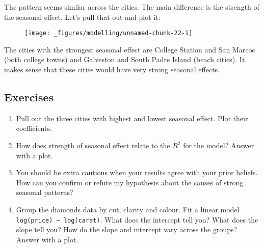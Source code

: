 The pattern seems similar across the cities. The main difference is the
strength of the seasonal effect. Let's pull that out and plot it:

\begin{Shaded}
\end{Shaded}

\begin{figure}[H]
  \centering
  \texttt{[image: \_figures/modelling/unnamed-chunk-22-1]}
\end{figure}

The cities with the strongest seasonal effect are College Station and
San Marcos (both college towns) and Galveston and South Padre Island
(beach cities). It makes sense that these cities would have very strong
seasonal effects.

\subsection{Exercises}

\begin{enumerate}
\def\labelenumi{\arabic{enumi}.}
\item
  Pull out the three cities with highest and lowest seasonal effect.
  Plot their coefficients.
\item
  How does strength of seasonal effect relate to the \(R^2\) for the
  model? Answer with a plot.
\item
  You should be extra cautious when your results agree with your prior
  beliefs. How can you confirm or refute my hypothesis about the causes
  of strong seasonal patterns?
\item
  Group the diamonds data by cut, clarity and colour. Fit a linear model
  \texttt{log(price)\ \textasciitilde{}\ log(carat)}. What does the
  intercept tell you? What does the slope tell you? How do the slope and
  intercept vary across the groups? Answer with a plot.
\end{enumerate}

